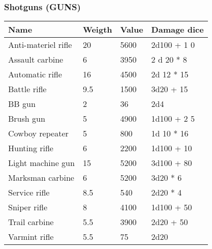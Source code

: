 
\subsubsection{Shotguns (GUNS)}
\begin{longtable}{|p{4cm}|p{1.5cm}|p{1.5cm}|p{9cm}|}
\hline
\bfseries Name & \bfseries Weigth & \bfseries Value & \bfseries Damage dice \\
\hline
Anti-materiel rifle & 20 & 5600 & 2d100 + 1 0 \\
Assault carbine & 6 & 3950 & 2 d 20 * 8 \\
Automatic rifle & 16 & 4500 & 2d 12 * 15 \\
Battle rifle & 9.5 & 1500 & 3d20 + 15 \\
BB gun & 2 & 36 & 2d4 \\
Brush gun & 5 & 4900 & 1d100 + 2 5 \\
Cowboy repeater & 5 & 800 & 1d 10 * 16 \\
Hunting rifle & 6 & 2200 & 1d100 + 10 \\
Light machine gun & 15 & 5200 & 3d100 + 80 \\
Marksman carbine & 6 & 5200 & 3d20 * 6 \\
Service rifle & 8.5 & 540 & 2d20 * 4 \\
Sniper rifle & 8 & 4100 & 1d100 + 50 \\
Trail carbine & 5.5 & 3900 & 2d20 + 50 \\
Varmint rifle & 5.5 & 75 & 2d20 \\
\hline
\end{longtable}

